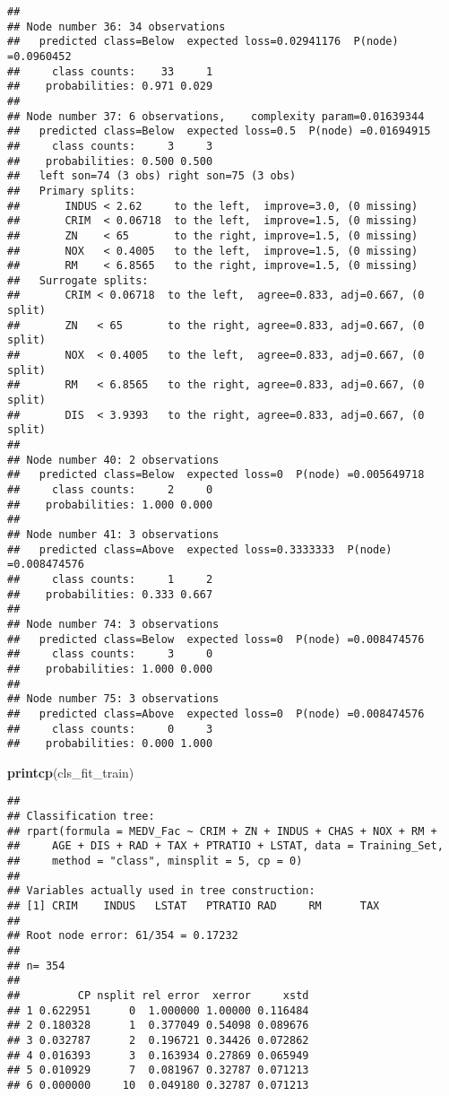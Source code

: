 \documentclass[
]{article}
\newenvironment{Shaded}{\begin{snugshade}}{\end{snugshade}}
\newcommand{\FunctionTok}[1]{\textcolor[rgb]{0.13,0.29,0.53}{\textbf{#1}}}
\newcommand{\NormalTok}[1]{#1}
\begin{document}
\begin{verbatim}
## 
## Node number 36: 34 observations
##   predicted class=Below  expected loss=0.02941176  P(node) =0.0960452
##     class counts:    33     1
##    probabilities: 0.971 0.029 
## 
## Node number 37: 6 observations,    complexity param=0.01639344
##   predicted class=Below  expected loss=0.5  P(node) =0.01694915
##     class counts:     3     3
##    probabilities: 0.500 0.500 
##   left son=74 (3 obs) right son=75 (3 obs)
##   Primary splits:
##       INDUS < 2.62     to the left,  improve=3.0, (0 missing)
##       CRIM  < 0.06718  to the left,  improve=1.5, (0 missing)
##       ZN    < 65       to the right, improve=1.5, (0 missing)
##       NOX   < 0.4005   to the left,  improve=1.5, (0 missing)
##       RM    < 6.8565   to the right, improve=1.5, (0 missing)
##   Surrogate splits:
##       CRIM < 0.06718  to the left,  agree=0.833, adj=0.667, (0 split)
##       ZN   < 65       to the right, agree=0.833, adj=0.667, (0 split)
##       NOX  < 0.4005   to the left,  agree=0.833, adj=0.667, (0 split)
##       RM   < 6.8565   to the right, agree=0.833, adj=0.667, (0 split)
##       DIS  < 3.9393   to the right, agree=0.833, adj=0.667, (0 split)
## 
## Node number 40: 2 observations
##   predicted class=Below  expected loss=0  P(node) =0.005649718
##     class counts:     2     0
##    probabilities: 1.000 0.000 
## 
## Node number 41: 3 observations
##   predicted class=Above  expected loss=0.3333333  P(node) =0.008474576
##     class counts:     1     2
##    probabilities: 0.333 0.667 
## 
## Node number 74: 3 observations
##   predicted class=Below  expected loss=0  P(node) =0.008474576
##     class counts:     3     0
##    probabilities: 1.000 0.000 
## 
## Node number 75: 3 observations
##   predicted class=Above  expected loss=0  P(node) =0.008474576
##     class counts:     0     3
##    probabilities: 0.000 1.000
\end{verbatim}

\begin{Shaded}
\begin{Highlighting}[]
\FunctionTok{printcp}\NormalTok{(cls\_fit\_train)}
\end{Highlighting}
\end{Shaded}

\begin{verbatim}
## 
## Classification tree:
## rpart(formula = MEDV_Fac ~ CRIM + ZN + INDUS + CHAS + NOX + RM + 
##     AGE + DIS + RAD + TAX + PTRATIO + LSTAT, data = Training_Set, 
##     method = "class", minsplit = 5, cp = 0)
## 
## Variables actually used in tree construction:
## [1] CRIM    INDUS   LSTAT   PTRATIO RAD     RM      TAX    
## 
## Root node error: 61/354 = 0.17232
## 
## n= 354 
## 
##         CP nsplit rel error  xerror     xstd
## 1 0.622951      0  1.000000 1.00000 0.116484
## 2 0.180328      1  0.377049 0.54098 0.089676
## 3 0.032787      2  0.196721 0.34426 0.072862
## 4 0.016393      3  0.163934 0.27869 0.065949
## 5 0.010929      7  0.081967 0.32787 0.071213
## 6 0.000000     10  0.049180 0.32787 0.071213
\end{verbatim}
\end{document}
